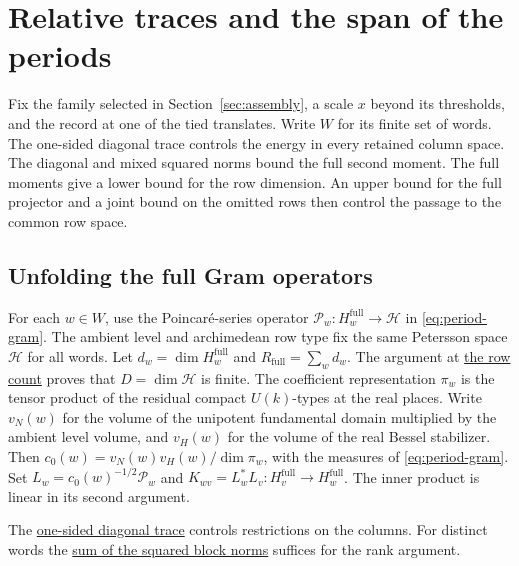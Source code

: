 \section{Relative traces and the span of the periods}
\label{sec:trace}

Fix the family selected in Section~\ref{sec:assembly}, a scale \(x\)
beyond its thresholds, and the record at one of the tied translates.
Write \(W\) for its finite set of words. The one-sided diagonal
trace controls the energy in every retained column space. The
diagonal and mixed squared norms bound the full second moment.
The full moments give a lower bound for the row dimension. An upper
bound for the full projector and a joint bound on the omitted rows
then control the passage to the common row space.



\subsection{Unfolding the full Gram operators}
\leavevmode{}%
For each \(w\in W\), use the Poincar\'e-series operator
\(\mathcal P_w:H_w^{\mathrm{full}}\to\mathcal H\) in
\eqref{eq:period-gram}. The ambient level and archimedean row type fix
the same Petersson space \(\mathcal H\) for all words. Let
\(d_w=\dim H_w^{\mathrm{full}}\) and \(R_{\mathrm{full}}=\sum_w d_w\).
The argument at \hyperlink{proof.one-sided-row-count}{the row count}
proves that \(D=\dim\mathcal H\) is finite. The coefficient representation
\(\pi_w\) is the tensor product of the residual compact \(U(k)\)-types
at the real places. Write \(v_N(w)\) for the volume of the unipotent
fundamental domain multiplied by the ambient level volume, and
\(v_H(w)\) for the volume of the real Bessel stabilizer. Then
\(c_0(w)=v_N(w)v_H(w)/\dim\pi_w\), with the measures of
\eqref{eq:period-gram}. Set \(L_w=c_0(w)^{-1/2}\mathcal P_w\) and
\(K_{wv}=L_w^*L_v:H_v^{\mathrm{full}}\to H_w^{\mathrm{full}}\).
The inner product is linear in its second argument.

The \hyperlink{proof.one-sided-diagonal}{one-sided diagonal trace}
controls restrictions on the columns. For distinct words the
\hyperlink{proof.summed-mixed-estimate}{sum of the squared block norms}
suffices for the rank argument.

